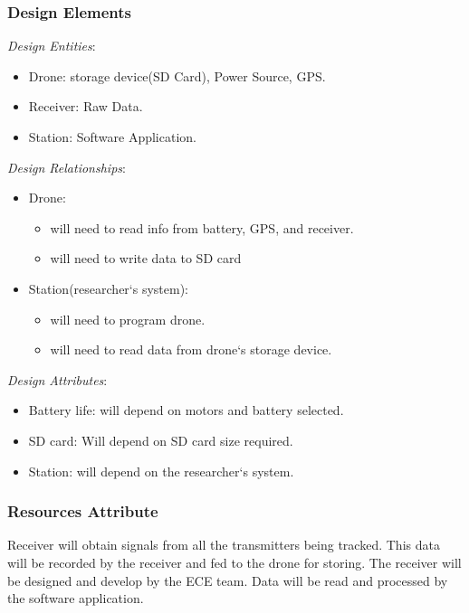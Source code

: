 \documentclass[onecolumn, draftclsnofoot,10pt, compsoc]{IEEEtran}
\begin{document}
\subsubsection{Design Elements}
\textit{Design Entities}:
\begin{itemize}
    \item Drone: storage device(SD Card), Power Source, GPS.
	\item Receiver: Raw Data.
	\item Station: Software Application.
\end{itemize}
\textit{Design Relationships}:
\begin{itemize}
    \item Drone: 
    \begin{itemize}
        \item will need to read info from battery, GPS, and receiver.
        \item will need to write data to SD card
    \end{itemize}
    \item Station(researcher`s system):
    \begin{itemize}
        \item will need to program drone.
        \item will need to read data from drone`s storage device.
    \end{itemize}
\end{itemize}


\textit{Design Attributes}: 
    \begin{itemize}
        \item Battery life: will depend on motors and battery selected.
        \item SD card: Will depend on SD card size required.
        \item Station: will depend on the researcher`s system.
    \end{itemize}

\subsubsection{Resources Attribute}

Receiver will obtain signals from all the transmitters being tracked. This data will be recorded by the receiver and fed to the drone for storing. The receiver will be designed and develop by the ECE team. Data will be read and processed by the software application.  
\end{document}

